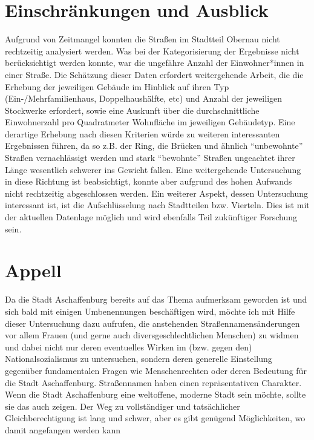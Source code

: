 \documentclass[ngerman,twocolumn,showpacs,%
  nofootinbib,aps,superscriptaddress,%
  eqsecnum,prd,notitlepage,showkeys,10pt,report]{revtex4-2}
\begin{document}
\section{Einschränkungen und Ausblick}
Aufgrund von Zeitmangel konnten die Straßen im Stadtteil Obernau nicht rechtzeitig
analysiert werden. Was bei der Kategorisierung der Ergebnisse nicht berücksichtigt werden
konnte, war die ungefähre Anzahl der Einwohner*innen in einer Straße. Die Schätzung
dieser Daten erfordert weitergehende Arbeit, die die Erhebung der jeweiligen Gebäude im
Hinblick auf ihren Typ (Ein-/Mehrfamilienhaus, Doppelhaushälfte, etc) und Anzahl der
jeweiligen Stockwerke erfordert, sowie eine Auskunft über die durchschnittliche
Einwohnerzahl pro Quadratmeter Wohnfläche im jeweiligen Gebäudetyp. Eine derartige
Erhebung nach diesen Kriterien würde zu weiteren interessanten Ergebnissen führen, da so
z.B. der Ring, die Brücken und ähnlich “unbewohnte” Straßen vernachlässigt werden und
stark “bewohnte” Straßen ungeachtet ihrer Länge wesentlich schwerer ins Gewicht fallen.
Eine weitergehende Untersuchung in diese Richtung ist beabsichtigt, konnte aber aufgrund
des hohen Aufwands nicht rechtzeitig abgeschlossen werden.
Ein weiterer Aspekt, dessen Untersuchung interessant ist, ist die Aufschlüsselung nach
Stadtteilen bzw. Vierteln. Dies ist mit der aktuellen Datenlage möglich und wird ebenfalls Teil
zukünftiger Forschung sein.

\section{Appell}
Da die Stadt Aschaffenburg bereits auf das Thema aufmerksam geworden ist und sich bald
mit einigen Umbenennungen beschäftigen wird, möchte ich mit Hilfe dieser Untersuchung
dazu aufrufen, die anstehenden Straßennamensänderungen vor allem Frauen (und gerne
auch diversgeschlechtlichen Menschen) zu widmen und dabei nicht nur deren eventuelles
Wirken im (bzw. gegen den) Nationalsozialismus zu untersuchen, sondern deren generelle
Einstellung gegenüber fundamentalen Fragen wie Menschenrechten oder deren Bedeutung
für die Stadt Aschaffenburg.
Straßennamen haben einen repräsentativen Charakter. Wenn die Stadt Aschaffenburg eine
weltoffene, moderne Stadt sein möchte, sollte sie das auch zeigen. Der Weg zu vollständiger
und tatsächlicher Gleichberechtigung ist lang und schwer, aber es gibt genügend
Möglichkeiten, wo damit angefangen werden kann

\end{document}
